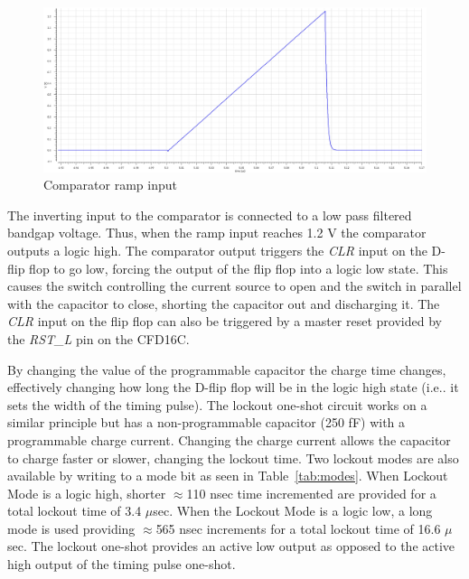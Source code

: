 \documentclass[12pt,oneside,final]{siuethesis}
\theoremstyle{definition}
\begin{document}
\begin{figure}[htbp!]
\centering
\includegraphics[scale=.3,keepaspectratio=true]{./ch3_figures/ramp.png} 
\caption{Comparator ramp input}
\label{fig:ramp}
\end{figure}

\par The inverting input to the comparator is connected to a low pass filtered bandgap voltage. Thus, when the ramp input reaches 1.2 V the comparator outputs a logic high. The comparator output triggers the \emph{CLR} input on the D-flip flop to go low, forcing the output of the flip flop into a logic low state. This causes the switch controlling the current source to open and the switch in parallel with the capacitor to close, shorting the capacitor out and discharging it. The \emph{CLR} input on the flip flop can also be triggered by a master reset provided by the \emph{RST\_L} pin on the CFD16C. 

\par By changing the value of the programmable capacitor the charge time changes, effectively changing how long the D-flip flop will be in the logic high state (i.e.. it sets the width of the timing pulse). The lockout one-shot circuit works on a similar principle but has a non-programmable capacitor (250 fF) with a programmable charge current. Changing the charge current allows the capacitor to charge faster or slower, changing the lockout time. Two lockout modes are also available by writing to a mode bit as seen in Table~\ref{tab:modes}. When Lockout Mode is a logic high, shorter $\approx$110 nsec time incremented are provided for a total lockout time of 3.4 $\mu$sec. When the Lockout Mode is a logic low, a long mode is used providing $\approx$565 nsec increments for a total lockout time of 16.6 $\mu$sec. The lockout one-shot provides an active low output as opposed to the active high output of the timing pulse one-shot.
\end{document}
